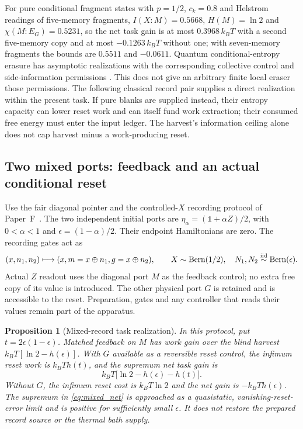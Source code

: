 \documentclass[12pt]{article}
\newtheorem{proposition}[theorem]{Proposition}
\begin{document}
For pure conditional fragment states with $p=1/2$, $c_k=0.8$ and Helstrom readings of five-memory fragments, $I(X{:}M)=0.5668$, $H(M)=\ln2$ and $\chi(M{:}E_G)=0.5231$, so the net task gain is at most $0.3968\,k_BT$ with a second five-memory copy and at most $-0.1263\,k_BT$ without one; with seven-memory fragments the bounds are $0.5511$ and $-0.0611$. Quantum conditional-entropy erasure has asymptotic realizations with the corresponding collective control and side-information permissions \cite{delRio2011}. This does not give an arbitrary finite local eraser those permissions. The following classical record pair supplies a direct realization within the present task. If pure blanks are supplied instead, their entropy capacity can lower reset work and can itself fund work extraction; their consumed free energy must enter the input ledger. The harvest's information ceiling alone does not cap harvest minus a work-producing reset.

\subsection{Two mixed ports: feedback and an actual conditional reset}
\label{subsec:mixed_task}

Use the fair diagonal pointer and the controlled-$X$ recording protocol of Paper~F~\cite{Liu2026HAFF_F}. The two independent initial ports are
$\eta_\alpha=(\mathbb 1+\alpha Z)/2$, with
$0<\alpha<1$ and $\epsilon=(1-\alpha)/2$.
Their endpoint Hamiltonians are zero. The recording gates act as
\[
 (x,n_1,n_2)\longmapsto
 (x,m=x\oplus n_1,g=x\oplus n_2),
 \qquad X\sim{\rm Bern}(1/2),\quad
 N_1,N_2\overset{\rm iid}{\sim}{\rm Bern}(\epsilon).
\]
Actual $Z$ readout uses the diagonal port $M$ as the feedback control; no extra free copy of its value is introduced. The other physical port $G$ is retained and is accessible to the reset. Preparation, gates and any controller that reads their values remain part of the apparatus.

\begin{proposition}[Mixed-record task realization]
\label{prop:mixed_task}
In this protocol, put $t=2\epsilon(1-\epsilon)$. Matched feedback on $M$ has work gain over the blind harvest
$k_BT[\ln2-h(\epsilon)]$. With $G$ available as a reversible reset control, the infimum reset work is $k_BT h(t)$, and the supremum net task gain is
\begin{equation}
\label{eq:mixed_net}
 k_BT\bigl[\ln2-h(\epsilon)-h(t)\bigr].
\end{equation}
Without $G$, the infimum reset cost is $k_BT\ln2$ and the net gain is $-k_BT h(\epsilon)$.
The supremum in \eqref{eq:mixed_net} is approached as a quasistatic, vanishing-reset-error limit and is positive for sufficiently small $\epsilon$. It does not restore the prepared record source or the thermal bath supply.
\end{proposition}
\end{document}
